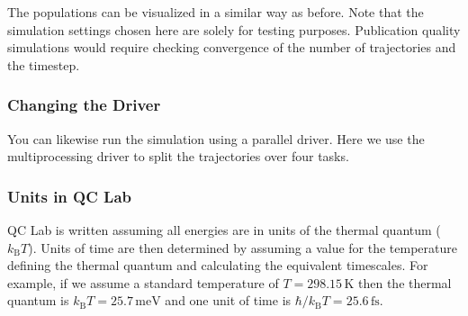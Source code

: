 \documentclass[letterpaper,10pt,english]{sphinxmanual}
\begin{document}
\sphinxAtStartPar
The populations can be visualized in a similar way as before. Note that the simulation settings chosen here are solely for testing
purposes. Publication quality simulations would require checking convergence of the number of trajectories and the timestep.




\subsubsection{Changing the Driver}
\label{\detokenize{user_guide/quickstart/quickstart:changing-the-driver}}
\sphinxAtStartPar
You can likewise run the simulation using a parallel driver. Here we use the multiprocessing driver to split the trajectories
over four tasks.

\begin{sphinxVerbatim}[commandchars=\\\{\}]
   

   
\end{sphinxVerbatim}


\subsubsection{Units in QC Lab}
\label{\detokenize{user_guide/quickstart/quickstart:units-in-qc-lab}}
\sphinxAtStartPar
QC Lab is written assuming all energies are in units of the thermal quantum (\(k_{\mathrm{B}}T\)). Units of time are then determined by assuming a value for
the temperature defining the thermal quantum and calculating the equivalent timescales. For example, if we assume a standard temperature of \(T = 298.15\,\mathrm{K}\)
then the thermal quantum is \(k_{\mathrm{B}}T = 25.7\,\mathrm{meV}\) and one unit of time is \(\hbar/k_{\mathrm{B}}T = 25.6\,\mathrm{fs}\).
\end{document}
